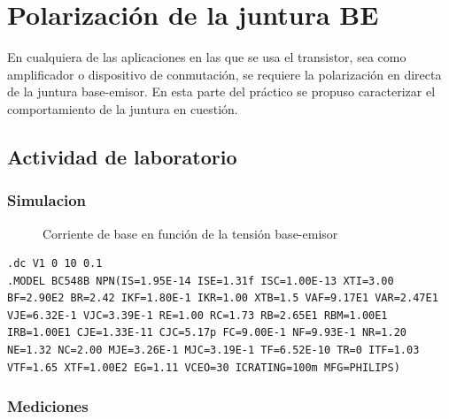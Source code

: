 \chapter{Polarización de la juntura BE}

En cualquiera de las aplicaciones en las que se usa el transistor, sea como amplificador o dispositivo de conmutación, se requiere la polarización en directa de la juntura base-emisor.
En esta parte del práctico se propuso caracterizar el comportamiento de la juntura en cuestión.

\section{Actividad de laboratorio}

\subsection{Simulacion}

\begin{figure}[H]
\centering
{}
\caption{Corriente de base en función de la tensión base-emisor}
\label{fig:IBvsVBE}
\end{figure}

\begin{lstlisting}[style=ltspice, caption={Parámetros de simulación LTspice}]
.dc V1 0 10 0.1
.MODEL BC548B NPN(IS=1.95E-14 ISE=1.31f ISC=1.00E-13 XTI=3.00 BF=2.90E2 BR=2.42 IKF=1.80E-1 IKR=1.00 XTB=1.5 VAF=9.17E1 VAR=2.47E1 VJE=6.32E-1 VJC=3.39E-1 RE=1.00 RC=1.73 RB=2.65E1 RBM=1.00E1 IRB=1.00E1 CJE=1.33E-11 CJC=5.17p FC=9.00E-1 NF=9.93E-1 NR=1.20 NE=1.32 NC=2.00 MJE=3.26E-1 MJC=3.19E-1 TF=6.52E-10 TR=0 ITF=1.03 VTF=1.65 XTF=1.00E2 EG=1.11 VCEO=30 ICRATING=100m MFG=PHILIPS)
\end{lstlisting}

\subsection{Mediciones}

